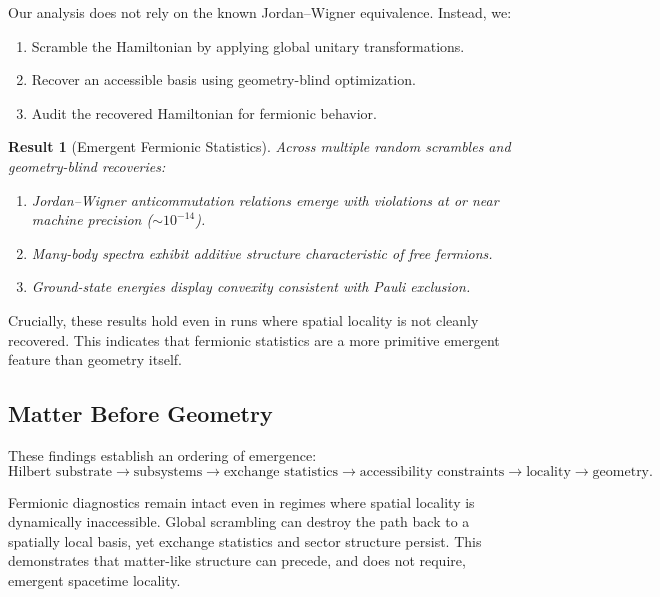 \documentclass[11pt]{article}
\newtheorem{result}{Result}
\begin{document}
Our analysis does not rely on the known Jordan--Wigner equivalence. Instead, we:
\begin{enumerate}
\item Scramble the Hamiltonian by applying global unitary transformations.
\item Recover an accessible basis using geometry-blind optimization.
\item Audit the recovered Hamiltonian for fermionic behavior.
\end{enumerate}

\begin{result}[Emergent Fermionic Statistics]
Across multiple random scrambles and geometry-blind recoveries:
\begin{enumerate}
\item Jordan--Wigner anticommutation relations emerge with violations at or near machine precision ($\sim 10^{-14}$).
\item Many-body spectra exhibit additive structure characteristic of free fermions.
\item Ground-state energies display convexity consistent with Pauli exclusion.
\end{enumerate}
\end{result}

Crucially, these results hold even in runs where spatial locality is not cleanly recovered. This indicates that fermionic statistics are a more primitive emergent feature than geometry itself.

\subsection{Matter Before Geometry}

These findings establish an ordering of emergence:
\begin{equation}
\text{Hilbert substrate} \rightarrow \text{subsystems} \rightarrow \text{exchange statistics} \rightarrow \text{accessibility constraints} \rightarrow \text{locality} \rightarrow \text{geometry}.
\end{equation}

Fermionic diagnostics remain intact even in regimes where spatial locality is dynamically inaccessible. Global scrambling can destroy the path back to a spatially local basis, yet exchange statistics and sector structure persist. This demonstrates that matter-like structure can precede, and does not require, emergent spacetime locality.

\end{document}
